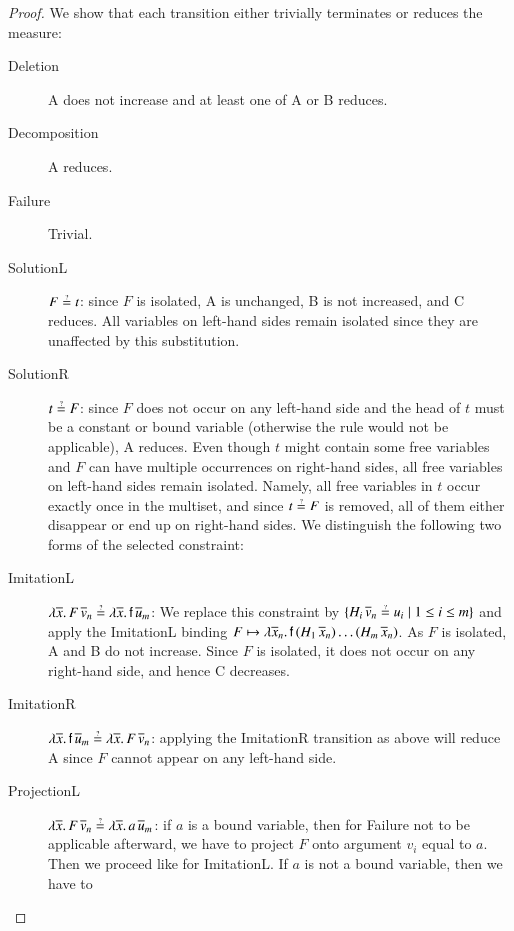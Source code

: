 \begin{proof}
  We show that each transition either trivially terminates or reduces the measure:
  \begin{description}
    \item[Deletion] A does not increase and at least one of A or B reduces.
    \item[Decomposition] A reduces.
    \item[Failure] Trivial. 
    \item[SolutionL]
    $F \unif t$: since $F$ is isolated, A is unchanged, B is not
    increased, and C reduces. All variables on left-hand sides remain isolated
    since they are unaffected by this substitution.
    \item[SolutionR] $t \unif F $: since $F$ does not occur on any left-hand side and the
    head of $t$ must be a constant or bound variable (otherwise the rule would
    not be applicable), A reduces. Even though $t$ might contain some free
    variables and $F$ can have multiple occurrences on right-hand sides, all
    free variables on left-hand sides remain isolated. Namely, all free variables
    in $t$ occur exactly once in the multiset, and since $t \unif F$ is
    removed, all of them either disappear or end up on right-hand sides.
    We distinguish the following two forms of the selected constraint:
      \item[ImitationL] $\lambda \overline{x}. \, F \, \overline{v}_n \unif \lambda \overline{x}. \,
      \cst{f} \, \overline{u}_m$: 
      We replace this constraint by 
      $\{H_i \, \overline{v}_n \unif u_i \mid 1\le i\le m\}$
      and apply the \textsf{ImitationL} binding
      $F \mapsto \lambda \overline{x}_n.\, \mathsf{f} \, (H_1 \, \overline{x}_n) \allowbreak
      \ldots (H_m \, \overline{x}_n)$.
      As $F$ is isolated, A and B do not increase.
      Since $F$ is isolated, it does not occur on any right-hand side, and hence C decreases.
      \item[ImitationR] $\lambda \overline{x}. \, \cst{f} \, \overline{u}_m \unif \lambda \overline{x}. \, F \, \overline{v}_n $:
      applying the \textsf{ImitationR} transition 
      as above will reduce A since $F$ cannot appear on any
      left-hand side.
    \item[ProjectionL]
        $\lambda \overline{x}. \, F \, \overline{v}_n \unif \lambda
        \overline{x}. \, a \, \overline{u}_m$: if $a$ is a bound variable,
        then for \textsf{Failure} not to be applicable afterward, we have to
        project $F$ onto argument $v_i$ equal to $a$. Then we proceed like for
        \textsf{ImitationL}. If $a$ is not a bound variable, then we have to

\end{description}
\end{proof}

